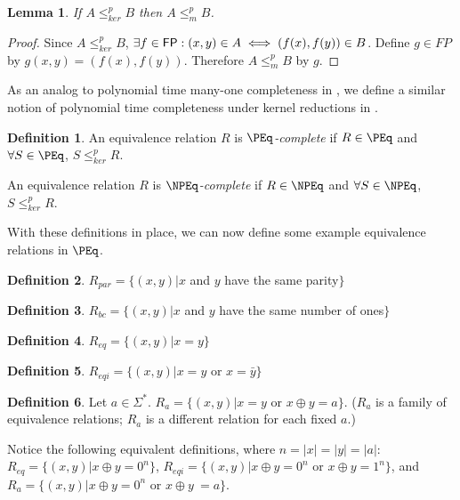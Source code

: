 \documentclass[draft]{article}
\newtheorem{lemma}{Lemma}%
\theoremstyle{definition}
\newtheorem{definition}{Definition}%
\newcommand{\sigmastar}{\Sigma^{*}}
\newcommand{\kr}{\leq^{p}_{ker}} %
\newcommand{\mor}{\leq^{p}_{m}} %
\begin{document}
\begin{lemma}\label{lem:kr_mor}If $A\kr B$ then $A\mor B$.\end{lemma}
\begin{proof}
  Since $A\kr B$, $\exists f\in{\ensuremath{\mathsf{FP}}}: (x,y)\in A\iff(f(x), f(y))\in B$. Define
  $g\in FP$ by $g(x,y)=(f(x), f(y))$. Therefore $A\mor B$ by $g$.
\end{proof}

As an analog to polynomial time many-one completeness in \NP, we define a
similar notion of polynomial time completeness under kernel reductions in
\NPEq.

\begin{definition}\label{def:kernel_complete}
  An equivalence relation $R$ is \textit{$\PEq$-complete} if $R\in\PEq$ and
  $\forall S\in\PEq$, $S\kr R$.

  An equivalence relation $R$ is \textit{$\NPEq$-complete} if $R\in\NPEq$ and
  $\forall S\in\NPEq$, $S\kr R$.
\end{definition}

With these definitions in place, we can now define some example equivalence
relations in $\PEq$.

\begin{definition}
  $R_{par}=\{(x, y)|x$ and $y$ have the same parity$\}$
\end{definition}

\begin{definition}
  $R_{bc}=\{(x, y)|x$ and $y$ have the same number of ones$\}$
\end{definition}

\begin{definition}
  $R_{eq}=\{(x, y)|x=y\}$
\end{definition}

\begin{definition}
  $R_{eqi}=\{(x, y)|x=y$ or $x=\bar{y}\}$
\end{definition}

\begin{definition}
  Let $a\in\sigmastar$. $R_{a}=\{(x,y)|x=y$ or $x\oplus y=a\}$. ($R_{a}$ is a
  family of equivalence relations; $R_{a}$ is a different relation for each
  fixed $a$.)
\end{definition}

Notice the following equivalent definitions, where $n=|x|=|y|=|a|$:
$R_{eq}=\{(x, y)|x \oplus y = 0^n\}$, $R_{eqi}=\{(x, y)|x \oplus y = 0^n$ or
$x\oplus y = 1^n\}$, and $R_{a}=\{(x,y)|x \oplus y = 0^n$ or $x \oplus y\ =
a\}$.
\end{document}
